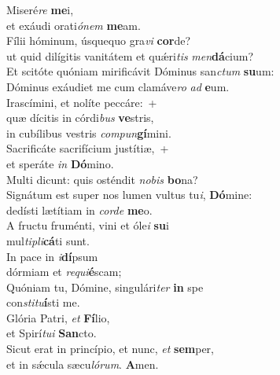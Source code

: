\evenverse Miseré\textit{re} \textbf{me}i,~\*\\
\evenverse et exáudi orati\textit{ó}\textit{nem} \textbf{me}am.\\
\oddverse Fílii hóminum, úsquequo gra\textit{vi} \textbf{cor}de?~\*\\
\oddverse ut quid dilígitis vanitátem et quǽri\textit{tis} \textit{men}\textbf{dá}cium?\\
\evenverse Et scitóte quóniam mirificávit Dóminus san\textit{ctum} \textbf{su}um:~\*\\
\evenverse Dóminus exáudiet me cum clamáve\textit{ro} \textit{ad} \textbf{e}um.\\
\oddverse Irascímini, et nolíte peccáre:~+\\
\oddverse  quæ dícitis in córdi\textit{bus} \textbf{ve}stris,~\*\\
\oddverse in cubílibus vestris \textit{com}\textit{pun}\textbf{gí}mini.\\
\evenverse Sacrificáte sacrifícium justítiæ,~+\\
\evenverse  et speráte \textit{in} \textbf{Dó}mino.~\*\\
\evenverse Multi dicunt: quis osténdit \textit{no}\textit{bis} \textbf{bo}na?\\
\oddverse Signátum est super nos lumen vultus tu\textit{i}, \textbf{Dó}mine:~\*\\
\oddverse dedísti lætítiam in \textit{cor}\textit{de} \textbf{me}o.\\
\evenverse A fructu fruménti, vini et óle\textit{i} \textbf{su}i~\*\\
\evenverse mul\textit{ti}\textit{pli}\textbf{cá}ti sunt.\\
\oddverse In pace in \textit{i}\textbf{dí}psum~\*\\
\oddverse dórmiam et \textit{re}\textit{qui}\textbf{é}scam;\\
\evenverse Quóniam tu, Dómine, singulári\textit{ter} \textbf{in} spe~\*\\
\evenverse con\textit{sti}\textit{tu}\textbf{í}sti me.\\
\oddverse Glória Patri, \textit{et} \textbf{Fí}lio,~\*\\
\oddverse et Spirí\textit{tu}\textit{i} \textbf{San}cto.\\
\evenverse Sicut erat in princípio, et nunc, \textit{et} \textbf{sem}per,~\*\\
\evenverse et in sǽcula sæcu\textit{ló}\textit{rum}. \textbf{A}men.\\
